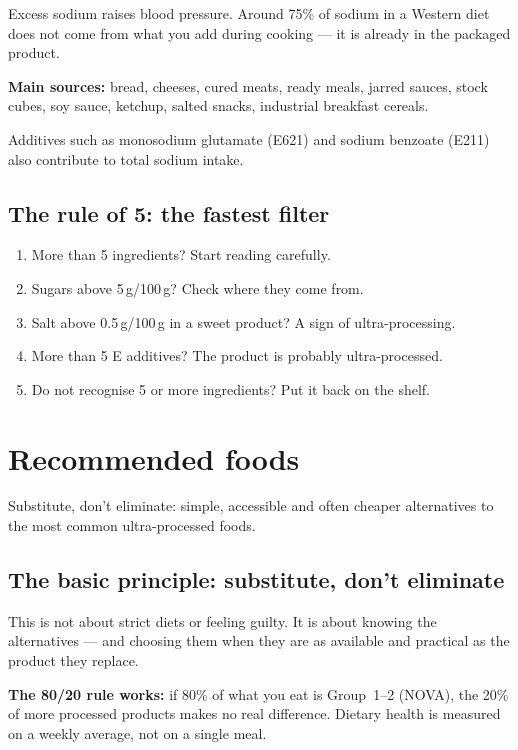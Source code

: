 \documentclass[a5paper,12pt,oneside,openany]{book}
\begin{document}
Excess sodium raises blood pressure. Around 75\% of sodium in a Western
diet does not come from what you add during cooking --- it is already in
the packaged product.

\textbf{Main sources:} bread, cheeses, cured meats, ready meals, jarred
sauces, stock cubes, soy sauce, ketchup, salted snacks, industrial
breakfast cereals.

Additives such as monosodium glutamate (E621) and sodium benzoate (E211)
also contribute to total sodium intake.

\section{The rule of 5: the fastest filter}

\begin{enumerate}
  \item More than 5 ingredients? Start reading carefully.
  \item Sugars above 5\,g/100\,g? Check where they come from.
  \item Salt above 0.5\,g/100\,g in a sweet product? A sign of
    ultra-processing.
  \item More than 5 E additives? The product is probably ultra-processed.
  \item Do not recognise 5 or more ingredients? Put it back on the shelf.
\end{enumerate}

\chapter{Recommended foods}

Substitute, don't eliminate: simple, accessible and often cheaper
alternatives to the most common ultra-processed foods.

\section{The basic principle: substitute, don't eliminate}

This is not about strict diets or feeling guilty. It is about knowing the
alternatives --- and choosing them when they are as available and practical
as the product they replace.

\textbf{The 80/20 rule works:} if 80\% of what you eat is Group~1--2
(NOVA), the 20\% of more processed products makes no real difference.
Dietary health is measured on a weekly average, not on a single meal.
\end{document}
